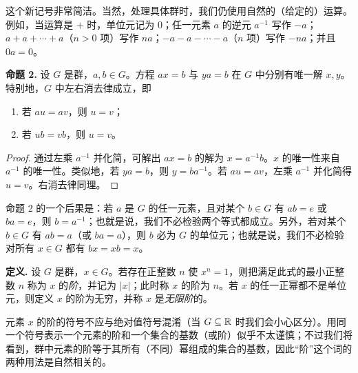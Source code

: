 这个新记号非常简洁。当然，处理具体群时，我们仍使用自然的（给定的）运算。例如，当运算是 $+$ 时，单位元记为 $0$；任一元素 $a$ 的逆元 $a^{-1}$ 写作 $-a$；$a+a+\cdots+a$（$n>0$ 项）写作 $na$；$-a-a-\cdots-a$（$n$ 项）写作 $-na$；并且 $0a=0$。

\medskip
\noindent\textbf{命题 2.} 设 $G$ 是群，$a,b\in G$。方程 $ax=b$ 与 $ya=b$ 在 $G$ 中分别有唯一解 $x,y$。特别地，$G$ 中左右消去律成立，即
\begin{enumerate}[label=(\arabic*)]
  \item 若 $au=av$，则 $u=v$；
  \item 若 $ub=vb$，则 $u=v$。
\end{enumerate}

\begin{proof}
通过左乘 $a^{-1}$ 并化简，可解出 $ax=b$ 的解为 $x=a^{-1}b$。$x$ 的唯一性来自 $a^{-1}$ 的唯一性。类似地，若 $ya=b$，则 $y=ba^{-1}$。若 $au=av$，左乘 $a^{-1}$ 并化简得 $u=v$。右消去律同理。
\end{proof}

命题 2 的一个后果是：若 $a$ 是 $G$ 的任一元素，且对某个 $b\in G$ 有 $ab=e$ 或 $ba=e$，则 $b=a^{-1}$；也就是说，我们不必检验两个等式都成立。另外，若对某个 $b\in G$ 有 $ab=a$（或 $ba=a$），则 $b$ 必为 $G$ 的单位元；也就是说，我们不必检验对所有 $x\in G$ 都有 $bx=xb=x$。

\noindent\textbf{定义.} 设 $G$ 是群，$x\in G$。若存在正整数 $n$ 使 $x^n=1$，则把满足此式的最小正整数 $n$ 称为 $x$ 的\emph{阶}，并记为 $|x|$；此时称 $x$ 的阶为 $n$。若 $x$ 的任一正幂都不是单位元，则定义 $x$ 的阶为无穷，并称 $x$ 是\emph{无限阶}的。

元素 $x$ 的阶的符号不应与绝对值符号混淆（当 $G\subseteq\mathbb{R}$ 时我们会小心区分）。用同一个符号表示一个元素的阶和一个集合的基数（或阶）似乎不太谨慎；不过我们将看到，群中元素的阶等于其所有（不同）幂组成的集合的基数，因此“阶”这个词的两种用法是自然相关的。

